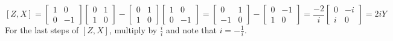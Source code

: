 \documentclass[12pt]{exam}
\begin{document}
\begin{solution}
$$    $$
    $$
    [Z,X]=\begin{bmatrix}
        1 & 0 \\ 0 & -1
    \end{bmatrix}\begin{bmatrix}
        0 & 1 \\ 1 & 0
    \end{bmatrix}-\begin{bmatrix}
        0 & 1 \\ 1 & 0
    \end{bmatrix}\begin{bmatrix}
        1 & 0 \\ 0 & -1
    \end{bmatrix}=\begin{bmatrix}
        0 & 1 \\ -1 & 0
    \end{bmatrix}-\begin{bmatrix}
        0 & -1 \\ 1 & 0
    \end{bmatrix}=\frac{-2}{i}\begin{bmatrix}
        0 & -i \\ i & 0
    \end{bmatrix}=2iY$$
    For the last steps of $[Z,X]$, multiply by $\frac{i}{i}$ and note that $i =-\frac{1}{i}$.
\end{solution}
\end{document}
